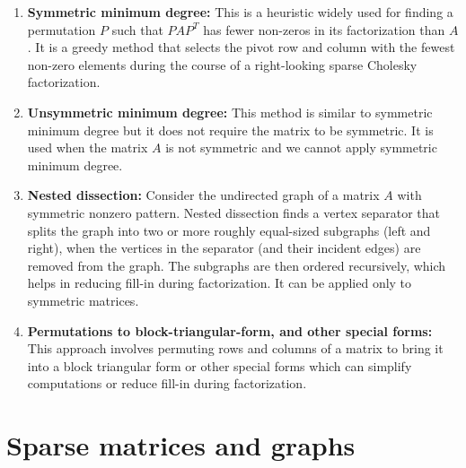 \documentclass[11pt]{book}
\begin{document}
\begin{enumerate}  
    \item \textbf{Symmetric minimum degree:} This is a heuristic widely used for finding a permutation $P$ such that $P A P^{T}$ has fewer non-zeros in its factorization than $A$. It is a greedy method that selects the pivot row and column with the fewest non-zero elements during the course of a right-looking sparse Cholesky factorization.  
      
    \item \textbf{Unsymmetric minimum degree:} This method is similar to symmetric minimum degree but it does not require the matrix to be symmetric. It is used when the matrix $A$ is not symmetric and we cannot apply symmetric minimum degree.  
      
    \item \textbf{Nested dissection:}  Consider the undirected graph of a matrix $A$ with symmetric nonzero pattern. Nested dissection finds a vertex separator that splits the graph into two or more roughly equal-sized subgraphs (left and right), when the vertices in the separator (and their incident edges) are removed from the graph. The subgraphs are then ordered recursively, which helps in reducing fill-in during factorization.  It can be applied only to symmetric matrices. 
      
    \item \textbf{Permutations to block-triangular-form, and other special forms:} This approach involves permuting rows and columns of a matrix to bring it into a block triangular form or other special forms which can simplify computations or reduce fill-in during factorization.   
\end{enumerate}  


\section*{Sparse matrices and graphs}
\end{document}
